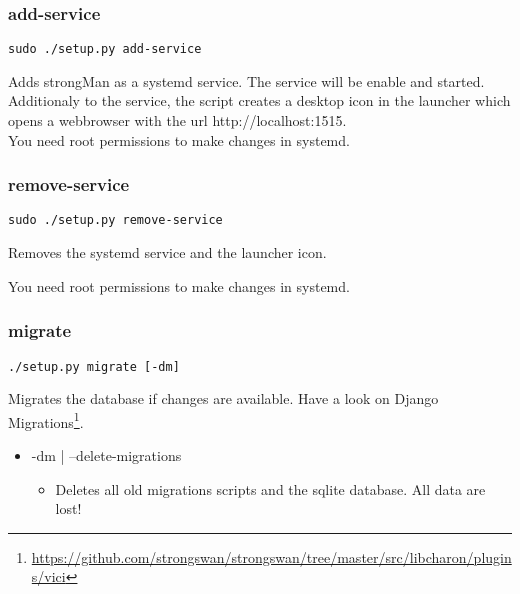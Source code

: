 \subsubsection{add-service}
\begin{lstlisting}[style=BashInputStyle]
	 sudo ./setup.py add-service
\end{lstlisting}
Adds strongMan as a systemd service. The service will be enable and started. Additionaly to the service, the script creates a desktop icon in the launcher which opens a webbrowser with the url http://localhost:1515.\\

You need root permissions to make changes in systemd.

\subsubsection{remove-service}
\begin{lstlisting}[style=BashInputStyle]
	 sudo ./setup.py remove-service
\end{lstlisting}
Removes the systemd service and the launcher icon.

You need root permissions to make changes in systemd.

\subsubsection{migrate}
\begin{lstlisting}[style=BashInputStyle]
	 ./setup.py migrate [-dm]
\end{lstlisting}
Migrates the database if changes are available. Have a look on Django Migrations\footnote{\url{https://github.com/strongswan/strongswan/tree/master/src/libcharon/plugins/vici}}.
\begin{itemize}
	\item -dm | --delete-migrations
	\begin{itemize}
	    \item Deletes all old migrations scripts and the sqlite database. All data are lost!
	\end{itemize}
\end{itemize}